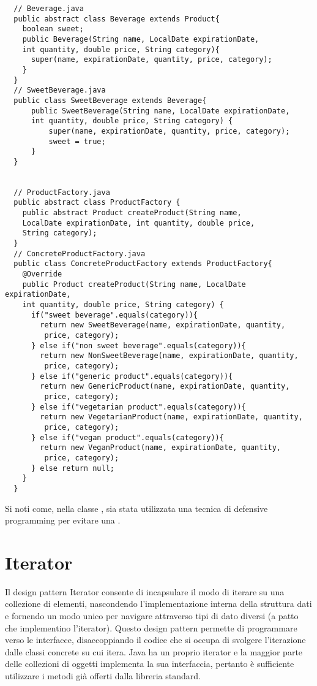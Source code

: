 \begin{lstlisting}
  // Beverage.java
  public abstract class Beverage extends Product{
    boolean sweet;
    public Beverage(String name, LocalDate expirationDate, 
    int quantity, double price, String category){
      super(name, expirationDate, quantity, price, category);
    }
  }
  // SweetBeverage.java
  public class SweetBeverage extends Beverage{
	  public SweetBeverage(String name, LocalDate expirationDate,
      int quantity, double price, String category) {
		  super(name, expirationDate, quantity, price, category);
		  sweet = true;
	  }
  }

  
  // ProductFactory.java
  public abstract class ProductFactory {
	public abstract Product createProduct(String name, 
    LocalDate expirationDate, int quantity, double price,
	String category);
  }
  // ConcreteProductFactory.java
  public class ConcreteProductFactory extends ProductFactory{
    @Override
    public Product createProduct(String name, LocalDate expirationDate,
    int quantity, double price, String category) {
      if("sweet beverage".equals(category)){
        return new SweetBeverage(name, expirationDate, quantity,
         price, category);
      } else if("non sweet beverage".equals(category)){
        return new NonSweetBeverage(name, expirationDate, quantity,
         price, category);
      } else if("generic product".equals(category)){
        return new GenericProduct(name, expirationDate, quantity,
         price, category);
      } else if("vegetarian product".equals(category)){
        return new VegetarianProduct(name, expirationDate, quantity,
         price, category);
      } else if("vegan product".equals(category)){
        return new VeganProduct(name, expirationDate, quantity,
         price, category);
      } else return null;
    }
  }
\end{lstlisting}

Si noti come, nella classe , sia stata utilizzata una tecnica di defensive programming per evitare una .

\section{Iterator}

Il design pattern Iterator consente di incapsulare il modo di iterare su una collezione di elementi, nascondendo l'implementazione interna della struttura dati e fornendo un modo unico per navigare attraverso tipi di dato diversi (a patto che implementino l'iterator). Questo design pattern permette di programmare verso le interfacce, disaccoppiando il codice che si occupa di svolgere l'iterazione dalle classi concrete su cui itera. Java ha un proprio iterator e la maggior parte delle collezioni di oggetti implementa la sua interfaccia, pertanto è sufficiente utilizzare i metodi già offerti dalla libreria standard.

